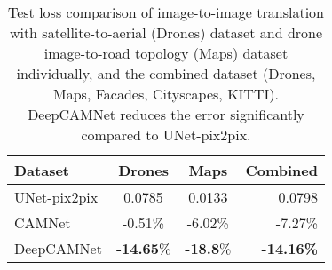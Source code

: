 \documentclass[10pt,twocolumn,letterpaper]{article}
\begin{document}
\begin{table}[ht]
	\caption{Test loss comparison of image-to-image translation with satellite-to-aerial (Drones) dataset and drone image-to-road topology (Maps) dataset individually, and the combined dataset (Drones, Maps, Facades, Cityscapes, KITTI). DeepCAMNet reduces the error significantly compared to UNet-pix2pix.}
	\label{tab:imtoim}
	\vspace{-0.2in}
	\begin{center}
		\begin{tabular}[width=\columnwidth]{@{}lccr@{}}
			\toprule
			Dataset 			& Drones & Maps	& Combined \\
			\midrule
			UNet-pix2pix     	&0.0785 &0.0133 &0.0798	\\
			\midrule
			CAMNet   			&-0.51\%    &-6.02\%	&-7.27\%	\\
			DeepCAMNet       	&\textbf{-14.65}\% 		&\textbf{-18.8}\%   &\textbf{-14.16\%}	\\
			\bottomrule
		\end{tabular}
	\end{center}
	\vspace{-0.1in}
\end{table} 
\end{document}
